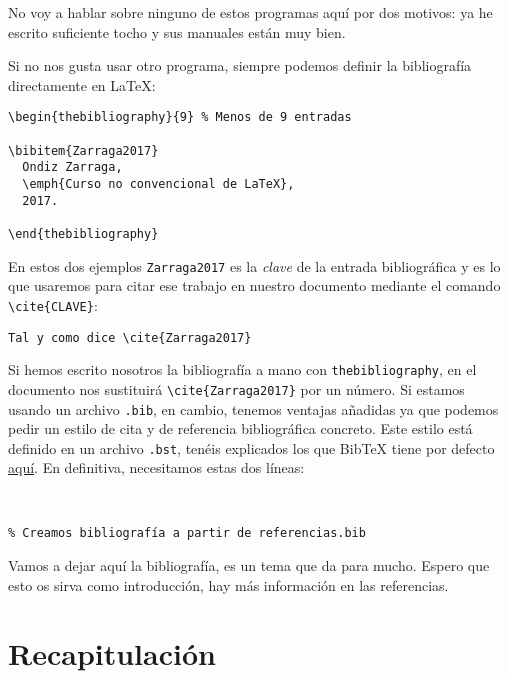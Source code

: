 No voy a hablar sobre ninguno de estos programas aquí por dos motivos:
ya he escrito suficiente tocho y sus manuales están muy bien.

Si no nos gusta usar otro programa, siempre podemos definir la
bibliografía directamente en LaTeX:

\begin{lstlisting}[language={[latex]tex}]
\begin{thebibliography}{9} % Menos de 9 entradas

\bibitem{Zarraga2017}
  Ondiz Zarraga,
  \emph{Curso no convencional de LaTeX},
  2017.

\end{thebibliography}
\end{lstlisting}

En estos dos ejemplos \lstinline!Zarraga2017! es la \emph{clave} de la
entrada bibliográfica y es lo que usaremos para citar ese trabajo en
nuestro documento mediante el comando \lstinline!\cite{CLAVE}!:

\begin{lstlisting}[language={[latex]tex}]
Tal y como dice \cite{Zarraga2017}
\end{lstlisting}

Si hemos escrito nosotros la bibliografía a mano con
\lstinline!thebibliography!, en el documento nos sustituirá
\lstinline!\cite{Zarraga2017}! por un número. Si estamos usando un
archivo \lstinline!.bib!, en cambio, tenemos ventajas añadidas ya que
podemos pedir un estilo de cita y de referencia bibliográfica concreto.
Este estilo está definido en un archivo \lstinline!.bst!, tenéis
explicados los que BibTeX tiene por defecto
\href{https://www.sharelatex.com/learn/Bibtex_bibliography_styles}{aquí}.
En definitiva, necesitamos estas dos líneas:

\begin{lstlisting}[language={[latex]tex}]
% Definimos el estilo bibliográfico


% Creamos bibliografía a partir de referencias.bib

\end{lstlisting}

Vamos a dejar aquí la bibliografía, es un tema que da para mucho. Espero
que esto os sirva como introducción, hay más información en las
referencias.

\section{Recapitulación}

